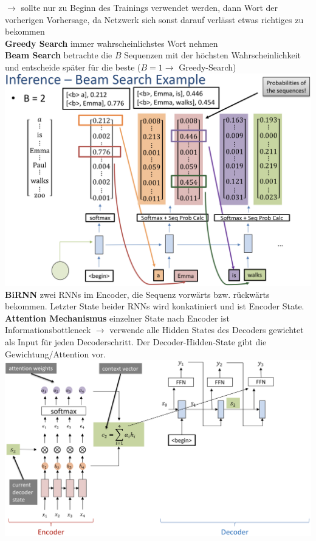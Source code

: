 \documentclass[12pt]{article}
\begin{document}
	$\rightarrow$ sollte nur zu Beginn des Trainings verwendet werden, dann Wort der vorherigen Vorhersage, da Netzwerk sich sonst darauf verlässt etwas richtiges zu bekommen\\
	\textbf{Greedy Search} immer wahrscheinlichstes Wort nehmen\\
	\textbf{Beam Search} betrachte die $B$ Sequenzen mit der höchsten Wahrscheinlichkeit und entscheide später für die beste ($B = 1 \rightarrow$ Greedy-Search)\\
	\includegraphics[width=\linewidth]{figures/beam-search.png}\\
	\textbf{BiRNN} zwei RNNs im Encoder, die Sequenz vorwärts bzw. rückwärts bekommen. Letzter State beider RNNs wird konkatiniert und ist Encoder State.\\
	\textbf{Attention Mechanismus} einzelner State nach Encoder ist Informationsbottleneck $\rightarrow$ verwende alle Hidden States des Decoders gewichtet als Input für jeden Decoderschritt. Der Decoder-Hidden-State gibt die Gewichtung/Attention vor.\\
	\includegraphics[width=\linewidth]{figures/attention.png}\\
\end{document}
